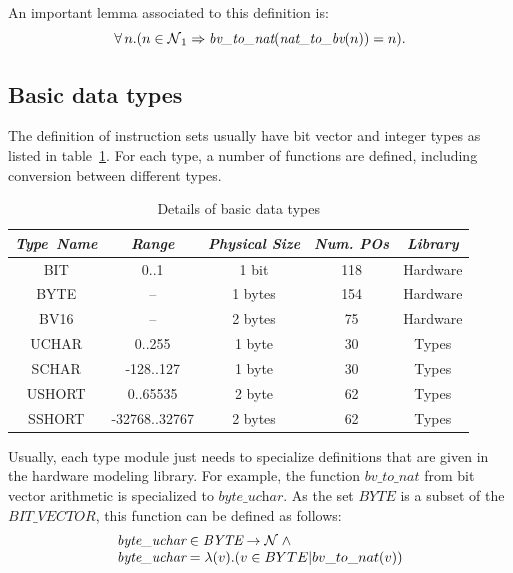 \documentclass[a4paper]{llncs}
\begin{document}
An important lemma associated to this definition is: 
$$\forall n . (n \in \nat_1 \implies \textit{bv\_to\_nat}(\textit{nat\_to\_bv}(n)) = n).$$



\subsection{Basic data types}

The definition of instruction sets usually have bit vector and integer
types as listed in table~\ref{tab:types}. For each type, a number of
functions are defined, including conversion between different types.

\begin{table}[h]
\caption{Details of basic data types}
\label{tab:types}
\begin{center}
\begin{tabular}{|c|c|c|c|c|}
\hline
 \textit{Type\ Name} & \textit{Range} & \textit{Physical Size}  & \textit{Num. POs} & \textit{Library} \\\hline
 BIT & 0..1 & 1 bit &   118 & Hardware \\\hline 
 BYTE & -- & 1 bytes &  154 & Hardware \\\hline
 BV16 & -- & 2 bytes &  75 & Hardware \\ \hline
 UCHAR & 0..255 & 1 byte &  30 & Types \\\hline
 SCHAR & -128..127 & 1 byte & 30 & Types \\\hline 
 USHORT & 0..65535 & 2 byte & 62 & Types \\\hline
 SSHORT & -32768..32767 & 2 bytes & 62 & Types \\\hline 
\end{tabular}
\end{center}
\end{table}

Usually, each type module just needs to specialize definitions that
are given in the hardware modeling library.  For example, the function
$\textit{bv\_to\_nat}$ from bit vector arithmetic is specialized to
$\textit{byte\_uchar}$. As the set $\textit{BYTE}$ is a subset of the
$\textit{BIT\_VECTOR}$, this function can be defined as follows:
$$
\begin{array}{l}
\textit{byte\_uchar} \in \textit{BYTE} \fun \nat \land \\
\textit{byte\_uchar} = \lambda (v) . ( v \in BYTE | bv\_to\_nat(v) )
\end{array}
$$
\end{document}
